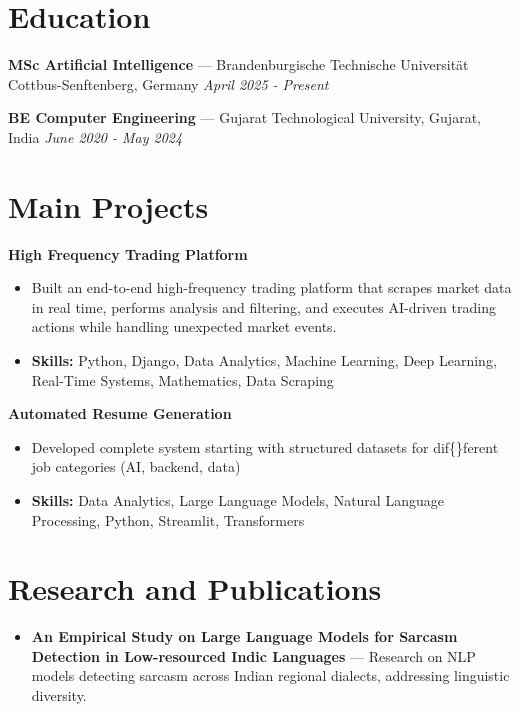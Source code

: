 \documentclass[a4paper,10pt]{article}
\begin{document}
\section*{Education}
\textbf{MSc Artificial Intelligence} — Brandenburgische Technische Universität Cottbus-Senftenberg, Germany \hfill \textit{April 2025 - Present}\par
\vspace{1.5pt}
\textbf{BE Computer Engineering} — Gujarat Technological University, Gujarat, India \hfill \textit{June 2020 - May 2024}\par

\section*{Main Projects}
\textbf{High Frequency Trading Platform}\par
\vspace{1pt}
\begin{itemize}
  \item Built an end-to-end high-frequency trading platform that scrapes market data in real time, performs analysis and filtering, and executes AI-driven trading actions while handling unexpected market events.
  \item \textbf{Skills:} Python, Django, Data Analytics, Machine Learning, Deep Learning, Real-Time Systems, Mathematics, Data Scraping
\end{itemize}
\vspace{3pt}
\textbf{Automated Resume Generation}\par
\vspace{1pt}
\begin{itemize}
  \item Developed complete system starting with structured datasets for dif\{\}ferent job categories (AI, backend, data)
  \item \textbf{Skills:} Data Analytics, Large Language Models, Natural Language Processing, Python, Streamlit, Transformers
\end{itemize}

\section*{Research and Publications}
\begin{itemize}
\item \textbf{An Empirical Study on Large Language Models for Sarcasm Detection in Low-resourced Indic Languages} — Research on NLP models detecting sarcasm across Indian regional dialects, addressing linguistic diversity.
\end{itemize}
\end{document}
